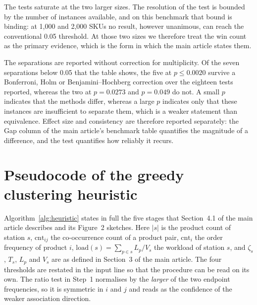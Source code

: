\documentclass[11pt]{article}
\begin{document}
The tests saturate at the two larger sizes. The resolution of the test is bounded by the number
of instances available, and on this benchmark that bound is binding: at 1{,}000 and 2{,}000
SKUs no result, however unanimous, can reach the conventional 0.05 threshold. At those two
sizes we therefore treat the win count as the primary evidence, which is the form in which the
main article states them.

The separations are reported without correction for multiplicity. Of the seven separations
below 0.05 that the table shows, the five at $p \le 0.0020$ survive a Bonferroni, Holm or
Benjamini--Hochberg correction over the eighteen tests reported, whereas the two at
$p = 0.0273$ and $p = 0.049$ do not. A small $p$ indicates that the methods differ, whereas a
large $p$ indicates only that these instances are insufficient to separate them, which is a
weaker statement than equivalence. Effect size and consistency are therefore reported
separately: the Gap column of the main article's benchmark table quantifies the magnitude of a
difference, and the test quantifies how reliably it recurs.

\section{Pseudocode of the greedy clustering heuristic}\label{sup:heuristic}
Algorithm~\ref{alg:heuristic} states in full the five stages that Section~4.1 of the main
article describes and its Figure~2 sketches. Here $|s|$ is the product count of station $s$,
$\mathrm{cnt}_{ij}$ the co-occurrence count of a product pair, $\mathrm{cnt}_i$ the order
frequency of product $i$, $\mathrm{load}(s)=\sum_{p\in s}L_p/V_s$ the workload of station $s$,
and $\zeta_s$, $T_s$, $L_p$ and $V_s$ are as defined in Section~3 of the main article. The four
thresholds are restated in the input line so that the procedure can be read on its own. The
ratio test in Step~1 normalises by the \emph{larger} of the two endpoint frequencies, so it is
symmetric in $i$ and $j$ and reads as the confidence of the weaker association direction.
\end{document}
